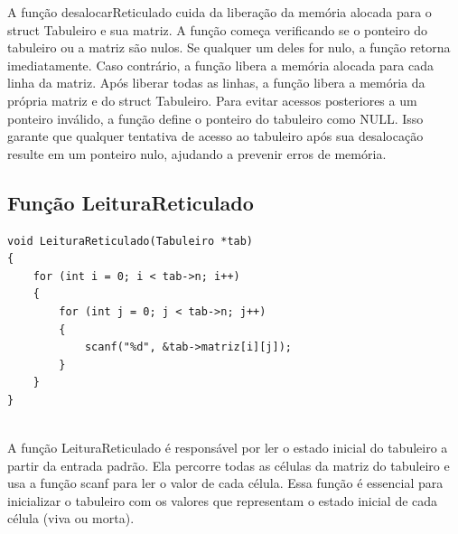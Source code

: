 \documentclass{article}
\begin{document}
 \par A função desalocarReticulado cuida da liberação da memória alocada para o struct Tabuleiro e sua matriz. A função começa verificando se o ponteiro do tabuleiro ou a matriz são nulos. Se qualquer um deles for nulo, a função retorna imediatamente. Caso contrário, a função libera a memória alocada para cada linha da matriz. Após liberar todas as linhas, a função libera a memória da própria matriz e do struct Tabuleiro. Para evitar acessos posteriores a um ponteiro inválido, a função define o ponteiro do tabuleiro como NULL. Isso garante que qualquer tentativa de acesso ao tabuleiro após sua desalocação resulte em um ponteiro nulo, ajudando a prevenir erros de memória.

 \subsection{Função LeituraReticulado}

\begin{lstlisting}[caption={},label={lst:cod1},language={[x86masm]Assembler}]
void LeituraReticulado(Tabuleiro *tab)
{
    for (int i = 0; i < tab->n; i++)
    {
        for (int j = 0; j < tab->n; j++)
        {
            scanf("%d", &tab->matriz[i][j]);
        }
    }
}


 \end{lstlisting}
 
\par A função LeituraReticulado é responsável por ler o estado inicial do tabuleiro a partir da entrada padrão. Ela percorre todas as células da matriz do tabuleiro e usa a função scanf para ler o valor de cada célula. Essa função é essencial para inicializar o tabuleiro com os valores que representam o estado inicial de cada célula (viva ou morta).
\end{document}
